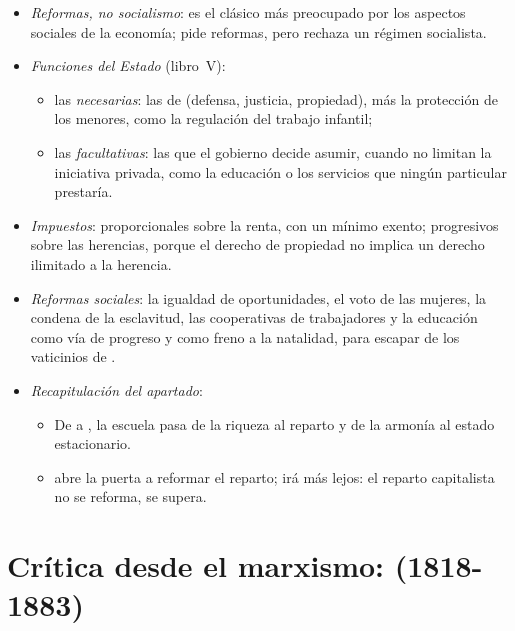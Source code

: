 \documentclass[11pt]{article}
\begin{document}
\begin{itemize}
\item \emph{Reformas, no socialismo}: es el clásico más preocupado por los aspectos sociales de la economía; pide reformas, pero rechaza un régimen socialista.
\item \emph{Funciones del Estado} (libro~V):
  \begin{itemize}
  \item las \emph{necesarias}: las de  (defensa, justicia, propiedad), más la protección de los menores, como la regulación del trabajo infantil;
  \item las \emph{facultativas}: las que el gobierno decide asumir, cuando no limitan la iniciativa privada, como la educación o los servicios que ningún particular prestaría.
  \end{itemize}
\item \emph{Impuestos}: proporcionales sobre la renta, con un mínimo exento; progresivos sobre las herencias, porque el derecho de propiedad no implica un derecho ilimitado a la herencia.
\item \emph{Reformas sociales}: la igualdad de oportunidades, el voto de las mujeres, la condena de la esclavitud, las cooperativas de trabajadores y la educación como vía de progreso y como freno a la natalidad, para escapar de los vaticinios de .
\item \emph{Recapitulación del apartado}:
  \begin{itemize}
  \item De  a , la escuela pasa de la riqueza al reparto y de la armonía al estado estacionario.
  \item {} abre la puerta a reformar el reparto;  irá más lejos: el reparto capitalista no se reforma, se supera.
  \end{itemize}
\end{itemize}

\section{Crítica desde el marxismo:  (1818-1883)}\label{sec:marx}
\end{document}
